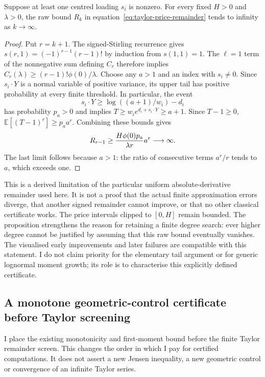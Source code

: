 \begin{proposition}
\label{prop:raw-remainder-growth}
Suppose at least one centred loading $s_i$ is nonzero. For every fixed
$H>0$ and $\lambda>0$, the raw bound $R_k$ in
equation~\eqref{eq:taylor-price-remainder} tends to infinity as
$k\to\infty$.
\end{proposition}
\begin{proof}
Put $r=k+1$. The signed-Stirling recurrence gives
$s(r,1)=(-1)^{r-1}(r-1)!$ by induction from $s(1,1)=1$.
The $\ell=1$ term of the nonnegative sum defining $C_r$ therefore implies
$C_r(\lambda)\geq(r-1)!\phi(0)/\lambda$. Choose any $a>1$ and an index
with $s_i\ne0$. Since $s_i\cdot Y$ is a normal variable of positive
variance, its upper tail has positive probability at every finite threshold.
In particular, the event
\[
 s_i\cdot Y\geq \log((a+1)/w_i)-d_i
\]
has probability $p_a>0$ and implies
$T\geq w_i e^{d_i+s_i\cdot Y}\geq a+1$. Since $T-1\geq0$,
$\mathbb E[(T-1)^r]\geq p_a a^r$. Combining these bounds gives
\[
 R_{r-1}\geq {H\phi(0)p_a\over\lambda r}a^r
       \longrightarrow\infty.
\]
The last limit follows because $a>1$: the ratio of consecutive terms
$a^r/r$ tends to $a$, which exceeds one.
\end{proof}

This is a derived limitation of the particular uniform absolute-derivative
remainder used here. It is not a proof that the actual finite approximation
errors diverge, that another signed remainder cannot improve, or that no
other classical certificate works. The price intervals clipped to $[0,H]$
remain bounded. The proposition strengthens the reason for retaining a
finite degree search: ever higher degree cannot be justified by assuming
that this raw bound eventually vanishes. The visualised early improvements
and later failures are compatible with this statement. I do not claim
priority for the elementary tail argument or for generic lognormal moment
growth; its role is to characterise this explicitly defined certificate.

\subsection{A monotone geometric-control certificate before Taylor screening}
\label{sec:monotone-before-taylor}

I place the existing monotonicity and first-moment bound before the finite
Taylor remainder screen. This changes the order in which I pay for certified
computations. It does not assert a new Jensen inequality, a new geometric
control or convergence of an infinite Taylor series.

